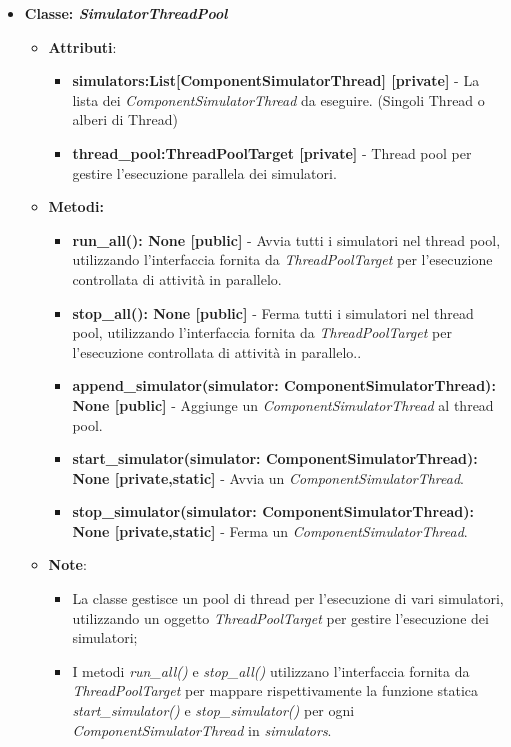 \begin{itemize}
\begin{itemize}
\begin{itemize}
    \end{itemize}
    \item{\textbf{Classe: \textit{SimulatorThreadPool}}}
    \begin{itemize}
    \item\textbf{Attributi}:
        \begin{itemize}
        \item \textbf{simulators:List[ComponentSimulatorThread] [private]} - La lista dei \textit{ComponentSimulatorThread} da eseguire. (Singoli Thread o alberi di Thread)
        \item \textbf{thread\_pool:ThreadPoolTarget [private]} - Thread pool per gestire l'esecuzione parallela dei simulatori.
    \end{itemize}
    \item \textbf{Metodi: }
    \begin{itemize}
        \item \textbf{run\_all(): None [public]} - Avvia tutti i simulatori nel thread pool, utilizzando l'interfaccia fornita da \textit{ThreadPoolTarget} per l'esecuzione controllata di attività in parallelo.
        \item \textbf{stop\_all(): None [public]} - Ferma tutti i simulatori nel thread pool, utilizzando l'interfaccia fornita da \textit{ThreadPoolTarget} per l'esecuzione controllata di attività in parallelo..
        \item \textbf{append\_simulator(simulator: ComponentSimulatorThread): None [public]} - Aggiunge un \textit{ComponentSimulatorThread} al thread pool.
        \item \textbf{start\_simulator(simulator: ComponentSimulatorThread): None [private,static]} - Avvia un \textit{ComponentSimulatorThread}.
        \item \textbf{stop\_simulator(simulator: ComponentSimulatorThread): None [private,static]} - Ferma un \textit{ComponentSimulatorThread}.
    \end{itemize}
    \item\textbf{Note}:
        \begin{itemize}
            \item La classe gestisce un pool di thread per l'esecuzione di vari simulatori, utilizzando un oggetto \textit{ThreadPoolTarget} per gestire l'esecuzione dei simulatori;
            \item I metodi \textit{run\_all()} e \textit{stop\_all()} utilizzano l'interfaccia fornita da \textit{ThreadPoolTarget} per mappare rispettivamente la funzione statica \textit{start\_simulator()} e \textit{stop\_simulator()} per ogni \textit{ComponentSimulatorThread} in \textit{simulators}.

\end{itemize}
\end{itemize}
\end{itemize}
\end{itemize}
